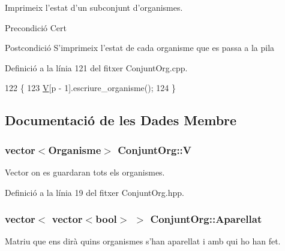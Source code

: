 Imprimeix l'estat d'un subconjunt d'organismes. 

\begin{DoxyPrecond}{Precondició}
Cert 
\end{DoxyPrecond}
\begin{DoxyPostcond}{Postcondició}
S'imprimeix l'estat de cada organisme que es passa a la pila 
\end{DoxyPostcond}


Definició a la línia 121 del fitxer Conjunt\-Org.\-cpp.


\begin{DoxyCode}
122 \{
123     \hyperlink{class_conjunt_org_adab11e0ac8295072ec682716478a535a}{V}[p - 1].escriure\_organisme();
124 \}
\end{DoxyCode}


\subsection{Documentació de les Dades Membre}
\hypertarget{class_conjunt_org_adab11e0ac8295072ec682716478a535a}{
\subsubsection[{V}]{\setlength{\rightskip}{0pt plus 5cm}vector$<${\bf Organisme}$>$ Conjunt\-Org\-::\-V\hspace{0.3cm}{\ttfamily [private]}}}\label{class_conjunt_org_adab11e0ac8295072ec682716478a535a}


Vector on es guardaran tots els organismes. 



Definició a la línia 19 del fitxer Conjunt\-Org.\-hpp.

\hypertarget{class_conjunt_org_a9782fdb4c89e8dd61762453de8f77fcb}{
\subsubsection[{Aparellat}]{\setlength{\rightskip}{0pt plus 5cm}vector$<$ vector$<$bool$>$ $>$ Conjunt\-Org\-::\-Aparellat\hspace{0.3cm}{\ttfamily [private]}}}\label{class_conjunt_org_a9782fdb4c89e8dd61762453de8f77fcb}


Matriu que ens dirà quins organismes s'han aparellat i amb qui ho han fet. 



